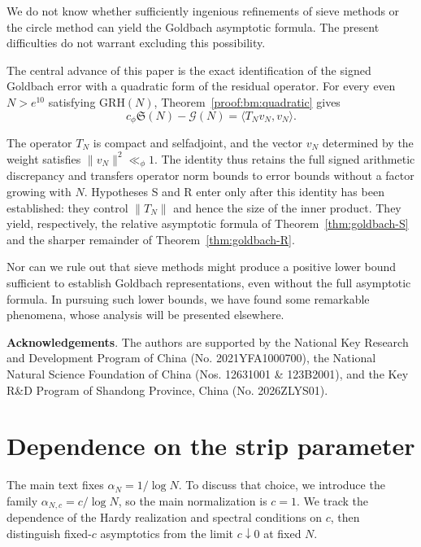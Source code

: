 \documentclass[12pt,a4paper]{amsart}
\numberwithin{equation}{section}
\theoremstyle{plain}
\theoremstyle{definition}
\theoremstyle{remark}
\begin{document}
We do not know whether sufficiently ingenious refinements of sieve
methods or the circle method can yield the Goldbach asymptotic
formula. The present difficulties do not warrant excluding this
possibility.

\begin{samepage}
The central advance of this paper is the exact identification of the
signed Goldbach error with a quadratic form of the residual operator.
For every even $N>e^{10}$ satisfying $\mathrm{GRH}(N)$,
Theorem~\ref{proof:bm:quadratic} gives
\[
 c_\phi\mathfrak S(N)-\mathcal G(N)
 =\langle T_Nv_N,v_N\rangle.
\]
\end{samepage}
The operator $T_N$ is compact and selfadjoint, and the vector $v_N$
determined by the weight satisfies $\|v_N\|^2\ll_\phi1$.
The identity thus retains the full signed arithmetic discrepancy and
transfers operator norm bounds to error bounds without a factor
growing with $N$. Hypotheses S and R enter only after this identity
has been established: they control $\|T_N\|$ and hence the size of
the inner product. They yield, respectively, the relative asymptotic
formula of Theorem~\ref{thm:goldbach-S} and the sharper remainder of
Theorem~\ref{thm:goldbach-R}.

Nor can we rule out that sieve methods might produce a positive
lower bound sufficient to establish Goldbach representations,
even without the full asymptotic formula. In pursuing such lower
bounds, we have found some remarkable phenomena, whose analysis
will be presented elsewhere.

\medskip
\noindent
{\bf Acknowledgements}. The authors are supported by the National Key
Research and Development Program of China (No. 2021YFA1000700), the
National Natural Science Foundation of China (Nos. 12631001 \& 123B2001),
and the Key R\&D Program of Shandong Province, China (No. 2026ZLYS01).
\medskip

\clearpage
\appendix

\section{Dependence on the strip parameter}\label{proof:app:param}

The main text fixes $\alpha_N=1/\log N$. To discuss that choice,
we introduce the family $\alpha_{N,c}=c/\log N$, so the main
normalization is $c=1$. We track the dependence of the Hardy
realization and spectral conditions on $c$, then distinguish
fixed-$c$ asymptotics from the limit $c\downarrow0$ at fixed $N$.
\end{document}
